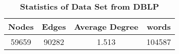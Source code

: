 \documentclass[10pt]{article}
\begin{document}
\begin{table}[H]
\caption{\bf{Statistics of Data Set from DBLP}}
\label{tab:statdblp}
\centering
\begin{tabular}{|c|c|c|c|}\hline
Nodes&Edges&Average Degree&words\\\hline
59659 &90282 &1.513 &104587\\\hline
\end{tabular}
\end{table}

%
%
\end{document}
